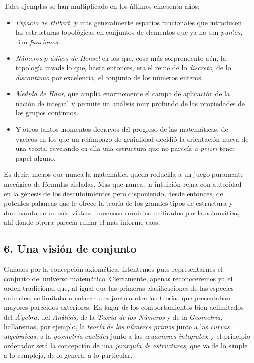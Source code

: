 \documentclass[a4paper, 12pt, draft]{article}
\begin{document}
Tales ejemplos se han multiplicado en los últimos cincuenta años: 

\begin{itemize}
\vspace{- 1em}

\item \textit{Espacio de Hilbert}, y más generalmente espacios funcionales que introducen las estructuras topológicas en conjuntos de elementos que ya no son \textit{puntos,} sino \textit{funciones.} 

\item \textit{Números $p$-ádicos de Hensel} en los que, cosa más sorprendente aún, la topología invade lo que, hasta entonces, era el reino de lo \textit{discreto,} de lo \textit{discontinuo} por excelencia, el conjunto de los números enteros.

\item \textit{Medida de Haar,} que amplía enormemente el campo de aplicación de la noción de integral y permite un análisis muy profundo de las propiedades de los grupos continuos.

\item Y otros tantos momentos decisivos del progreso de las matemáticas, de vuelcos en los que un relámpago de genialidad decidió la orientación nueva de una teoría, revelando en ella una estructura que no parecía \textit{a priori} tener papel alguno.

\end{itemize}

Es decir; menos que nunca la matemática queda reducida a un juego puramente mecánico de fórmulas aisladas. Más que nunca, la intuición reina con autoridad en la génesis de los descubrimientos pero disponiendo, desde entonces, de potentes palancas que le ofrece la teoría de los grandes tipos de estructura y dominando de un solo vistazo inmensos dominios unificados por la axiomática, ahí donde otrora parecía reinar el más informe caos.

\subsection*{6. Una visión de conjunto}

Guiados por la concepción axiomática, intentemos pues representarnos el conjunto del universo matemático. Ciertamente, apenas reconoceremos ya el orden tradicional que, al igual que las primeras clasificaciones de las especies animales, se limitaba a colocar una junto a otra las teorías que presentaban mayores parecidos exteriores. En lugar de los comportamientos bien delimitados del \textit{Álgebra,} del \textit{Análisis,} de la \textit{Teoría de los Números} y de la \textit{Geometría,} hallaremos, por ejemplo, la \textit{teoría de los números primos} junto a las \textit{curvas algebraicas,} o la \textit{geometría euclídea} junto a las \textit{ecuaciones integrales}; y el principio ordenador será la concepción de una \textit{jerarquía de estructuras,} que va de lo simple a lo complejo, de lo general a lo particular.
\end{document}
